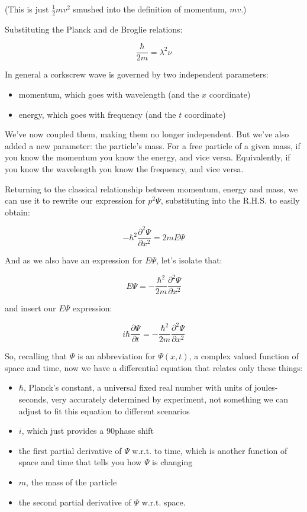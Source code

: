 (This is just $\frac{1}{2}mv^2$ smushed into the definition of momentum, $mv$.)

Substituting the Planck and de Broglie relations:

$$
\frac{\hbar}{2m} = \lambda^2\nu
$$

In general a corkscrew wave is governed by two independent parameters:

\begin{itemize}
  \item momentum, which goes with wavelength (and the $x$ coordinate)
  \item energy, which goes with frequency (and the $t$ coordinate)
\end{itemize}

We've now coupled them, making them no longer independent. But we've also added a new parameter: the particle's mass. For a free particle of a given mass, if you know the momentum you know the energy, and vice versa. Equivalently, if you know the wavelength you know the frequency, and vice versa.

Returning to the classical relationship between momentum, energy and mass, we can use it to rewrite our expression for $p^2 \Psi$, substituting into the R.H.S. to easily obtain:

$$
- \hbar^2 \frac{\partial^2 \Psi}{\partial x^2}
= 2mE\Psi
$$

And as we also have an expression for $E\Psi$, let's isolate that:

$$
E\Psi =
- \frac{\hbar^2}{2m} \frac{\partial^2 \Psi}{\partial x^2}
$$

and insert our $E\Psi$ expression:

$$
i\hbar \frac{\partial \Psi}{\partial t}
=
- \frac{\hbar^2}{2m} \frac{\partial^2 \Psi}{\partial x^2}
$$

So, recalling that $\Psi$ is an abbreviation for $\Psi(x, t)$, a complex valued function of space and time, now we have a differential equation that relates only these things:

\begin{itemize}
  \item $\hbar$, Planck's constant, a universal fixed real number with units of joules-seconds, very accurately determined by experiment, not something we can adjust to fit this equation to different scenarios
  \item $i$, which just provides a 90\textdegree phase shift
  \item the first partial derivative of $\Psi$ w.r.t. to time, which is another function of space and time that tells you how $\Psi$ is changing
  \item $m$, the mass of the particle
  \item the second partial derivative of $\Psi$ w.r.t. space.
\end{itemize}

